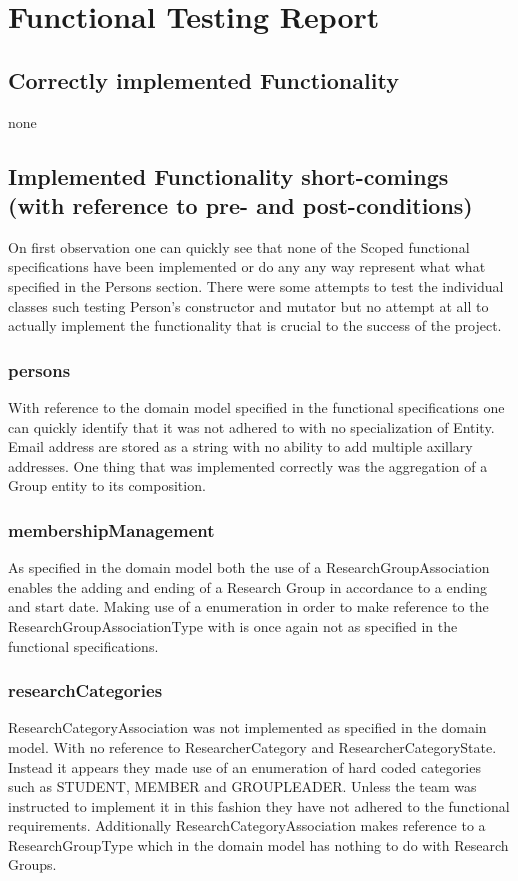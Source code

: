 \documentclass{article}
\begin{document}
\section{Functional Testing Report}

	\subsection{Correctly implemented Functionality}
	
	none

    \subsection{Implemented Functionality short-comings (with reference to pre- and post-conditions)}
    
    	On first observation one can quickly see that none of the Scoped functional specifications have been implemented or do any any way represent what what specified in the Persons section. There were some attempts to test the individual classes such testing Person's constructor and mutator but no attempt at all to actually implement the functionality that is crucial to the success of the project.
	
		\subsubsection{persons}
		With reference to the domain model specified in the functional specifications one can quickly identify that it was not adhered to with no specialization of Entity. Email address are stored as a string with no ability to add multiple axillary addresses. One thing that was implemented correctly was the aggregation of a Group entity to its composition.

		\subsubsection{membershipManagement}
		As specified in the domain model both the use of a ResearchGroupAssociation enables the adding and ending of a Research Group in accordance to a ending and start date. Making use of a enumeration in order to make reference to the ResearchGroupAssociationType with is once again not as specified in the functional specifications. 

		\subsubsection{researchCategories}
		ResearchCategoryAssociation was not implemented as specified in the domain model. With no reference to ResearcherCategory and ResearcherCategoryState. Instead it appears they made use of an enumeration of hard coded categories such as STUDENT, MEMBER and GROUPLEADER. Unless the team was instructed to implement it in this fashion they have not adhered to the functional requirements. Additionally ResearchCategoryAssociation makes reference to a ResearchGroupType which in the domain model has nothing to do with Research Groups.
\end{document}
